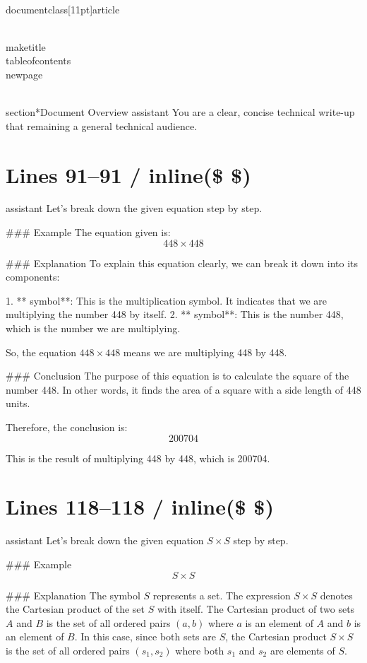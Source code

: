 \\documentclass[11pt]{article}
\begin{document}
\\maketitle
\\tableofcontents
\\newpage

\\section*{Document Overview}
assistant
You are a clear, concise technical write-up that remaining a general technical audience.

\newpage

\section*{Lines 91–91 / inline(\$ \$) }
assistant
Let's break down the given equation step by step.

### Example
The equation given is:
\[ 448 \times 448 \]

### Explanation
To explain this equation clearly, we can break it down into its components:

1. ** symbol**: This is the multiplication symbol. It indicates that we are multiplying the number 448 by itself.
2. ** symbol**: This is the number 448, which is the number we are multiplying.

So, the equation \( 448 \times 448 \) means we are multiplying 448 by 448.

### Conclusion
The purpose of this equation is to calculate the square of the number 448. In other words, it finds the area of a square with a side length of 448 units.

Therefore, the conclusion is:
\[ \boxed{200704} \]

This is the result of multiplying 448 by 448, which is 200704.


\section*{Lines 118–118 / inline(\$ \$) }
assistant
Let's break down the given equation \( S \times S \) step by step.

### Example
\[ S \times S \]

### Explanation
The symbol \( S \) represents a set. The expression \( S \times S \) denotes the Cartesian product of the set \( S \) with itself. The Cartesian product of two sets \( A \) and \( B \) is the set of all ordered pairs \((a, b)\) where \( a \) is an element of \( A \) and \( b \) is an element of \( B \). In this case, since both sets are \( S \), the Cartesian product \( S \times S \) is the set of all ordered pairs \((s_1, s_2)\) where both \( s_1 \) and \( s_2 \) are elements of \( S \).
\end{document}
